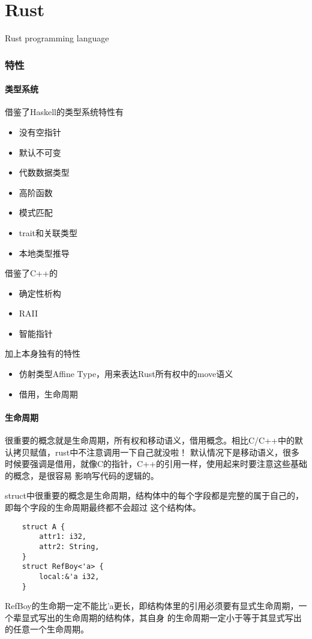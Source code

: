 \clearpage
\part{Rust}

Rust programming language

\section{特性}

\subsection{类型系统}
借鉴了Haskell的类型系统特性有
\begin{itemize}
    \item {没有空指针}
    \item {默认不可变}
    \item {代数数据类型}
    \item {高阶函数}
    \item {模式匹配}
    \item {trait和关联类型}
    \item {本地类型推导}
\end{itemize}
借鉴了C++的
\begin{itemize}
    \item {确定性析构}
    \item {RAII}
    \item {智能指针}
\end{itemize}
加上本身独有的特性
\begin{itemize}
    \item {仿射类型Affine Type，用来表达Rust所有权中的move语义}
    \item {借用，生命周期}
\end{itemize}

\subsection{生命周期}
很重要的概念就是生命周期，所有权和移动语义，借用概念。相比C/C++中的默认拷贝赋值，rust中不注意调用一下自己就没啦！
默认情况下是移动语义，很多时候要强调是借用，就像C的指针，C++的引用一样，使用起来时要注意这些基础的概念，是很容易
影响写代码的逻辑的。

struct中很重要的概念是生命周期，结构体中的每个字段都是完整的属于自己的，即每个字段的生命周期最终都不会超过
这个结构体。
\begin{lstlisting}
    struct A {
        attr1: i32,
        attr2: String,
    }
    struct RefBoy<'a> {
        local:&'a i32,
    }
\end{lstlisting}
RefBoy的生命期一定不能比'a更长，即结构体里的引用必须要有显式生命周期，一个辈显式写出的生命周期的结构体，其自身
的生命周期一定小于等于其显式写出的任意一个生命周期。

